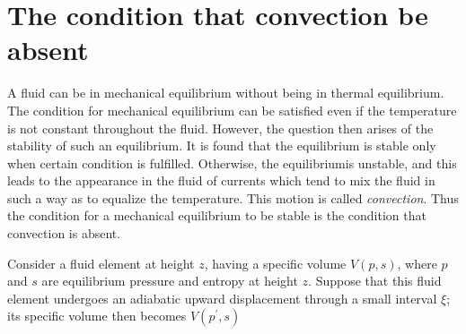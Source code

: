 \documentclass[conference]{IEEEtran}
\theoremstyle{definition}
\theoremstyle{remark}
\begin{document}
    \section{The condition that convection be absent}
    A fluid can be in mechanical equilibrium without being in thermal equilibrium. The condition for mechanical equilibrium can be satisfied even if the temperature is not constant throughout the fluid. However, the question then arises of the stability of such an equilibrium. It is found that the equilibrium is stable only when certain condition is fulfilled. Otherwise, the equilibriumis unstable, and this leads to the appearance in the fluid of currents which tend to mix the fluid in such a way as to equalize the temperature. This motion is called \emph{convection}. Thus the condition for a mechanical equilibrium to be stable is the condition that convection is absent.

    Consider a fluid element at height $z$, having a specific volume $V(p, s)$, where $p$ and $s$ are equilibrium pressure and entropy at height $z$. Suppose that this fluid element undergoes an adiabatic upward displacement through a small interval $\xi$; its specific volume then becomes $V(p^\prime, s)$
\end{document}
